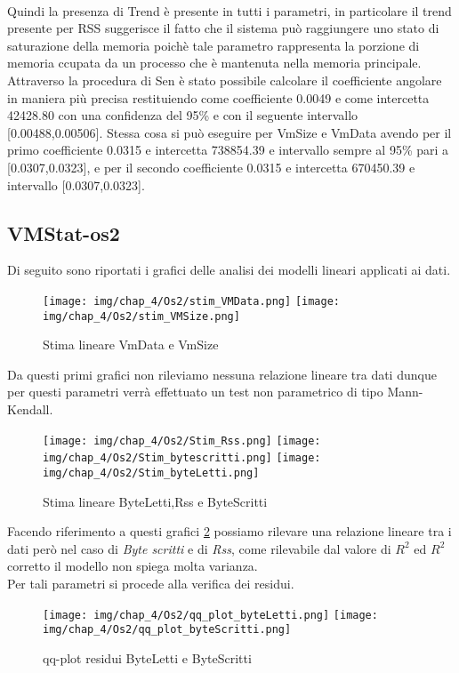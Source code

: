 \\
Quindi la presenza di Trend è presente in tutti i parametri, in particolare il trend presente per RSS suggerisce il fatto che il sistema può raggiungere uno stato di saturazione della memoria poichè tale parametro rappresenta la porzione di memoria ccupata da un processo che è mantenuta nella memoria principale.\\
Attraverso la procedura di Sen è stato possibile calcolare il coefficiente angolare in maniera più precisa restituiendo come coefficiente 0.0049 e come intercetta 42428.80 con una confidenza del 95\% e con il seguente intervallo [0.00488,0.00506].
Stessa cosa si può eseguire per VmSize e VmData avendo per il primo coefficiente 0.0315 e intercetta 738854.39 e intervallo sempre al 95\% pari a [0.0307,0.0323], e per il secondo coefficiente 0.0315 e intercetta 670450.39 e intervallo [0.0307,0.0323].
\subsection{VMStat-os2}
Di seguito sono riportati i grafici delle analisi dei modelli lineari applicati ai dati.
\begin{figure}[H]
    \centering
    \texttt{[image: img/chap\_4/Os2/stim\_VMData.png]}
    \texttt{[image: img/chap\_4/Os2/stim\_VMSize.png]}
    \caption{Stima lineare VmData e VmSize}
    \label{fig:residui}
\end{figure}
\noindent
Da questi primi grafici non rileviamo nessuna relazione lineare tra dati dunque per questi parametri verrà effettuato un test non parametrico di tipo Mann-Kendall.
\begin{figure}[H]
    \centering
    \texttt{[image: img/chap\_4/Os2/Stim\_Rss.png]}
    \texttt{[image: img/chap\_4/Os2/Stim\_bytescritti.png]}
    \texttt{[image: img/chap\_4/Os2/Stim\_byteLetti.png]}
    \caption{Stima lineare ByteLetti,Rss e ByteScritti}
    \label{fig:stimaLinBSL}
\end{figure}
\noindent
Facendo riferimento a questi grafici \ref{fig:stimaLinBSL} possiamo rilevare una relazione lineare tra i dati però nel caso di \textit{Byte scritti} e di \textit{Rss}, come rilevabile dal valore di $R^2$ ed $R^2$ corretto il modello non spiega molta varianza.\\
Per tali parametri si procede alla verifica dei residui.
\begin{figure}[H]
    \centering
    \texttt{[image: img/chap\_4/Os2/qq\_plot\_byteLetti.png]}
    \texttt{[image: img/chap\_4/Os2/qq\_plot\_byteScritti.png]}
    \caption{qq-plot residui ByteLetti e ByteScritti}
    \label{fig:qq-plot}
\end{figure}


